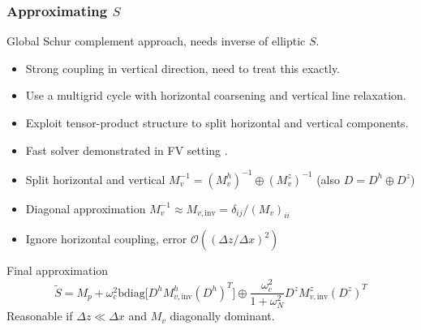 \documentclass[presentation]{beamer}
\begin{document}
\begin{frame}[allowframebreaks]
  \frametitle{Approximating $S$}
  Global Schur complement approach, needs inverse of elliptic $S$.
  \begin{itemize}
  \item Strong coupling in vertical direction, need to treat this
    exactly.
  \item Use a multigrid cycle with horizontal coarsening and
    vertical line relaxation.
  \item Exploit tensor-product structure to split horizontal and
    vertical components.
  \item Fast solver demonstrated in FV setting \parencite{Mueller:2014}.
  \end{itemize}
  \framebreak

  \begin{itemize}
  \item Split horizontal and vertical $M_v^{-1} =
    (M_v^h)^{-1}\oplus (M_v^z)^{-1}$ (also $D
    = D^h \oplus D^z$)
  \item Diagonal approximation $M_v^{-1} \approx M_{v,\text{inv}} = \delta_{ij} / (M_v)_{ii}$
  \item Ignore horizontal coupling, error $\mathcal{O}((\Delta z/
    \Delta x)^2)$
  \end{itemize}
  \begin{block}{Final approximation}
    \begin{equation*}
      \tilde{S} = M_p + \omega_c^2 \text{bdiag}\big[D^h M_{v,\text{inv}}^h
      (D^h)^T\big] \oplus \frac{\omega_c^2}{1 + \omega_N^2} D^z
      M_{v,\text{inv}}^z (D^z)^T
    \end{equation*}
    Reasonable if $\Delta z \ll \Delta x$ and $M_v$ diagonally dominant.
  \end{block}
\end{frame}
\end{document}
